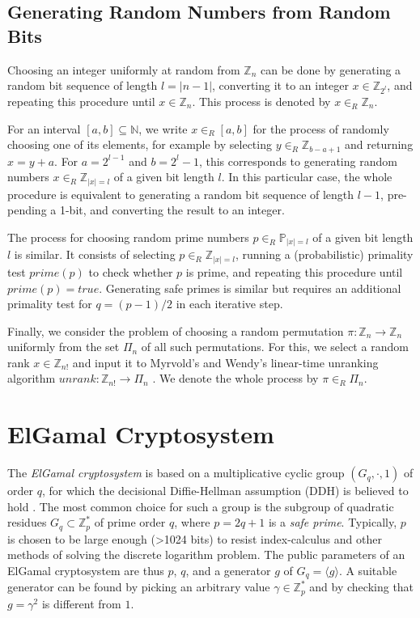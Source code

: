 \documentclass[bibtotoc,halfparskip,oneside]{scrreprt}
\begin{document}
	
	
	\subsection{Generating Random Numbers from Random Bits}
	Choosing an integer uniformly at random from $\mathbb{Z}_n$ can be done by generating a random bit sequence of length  $l=|n-1|$, converting it to an integer $x\in\mathbb{Z}_{2^l}$, and repeating this procedure until $x\in\mathbb{Z}_n$. This process is denoted by $x\in_R\mathbb{Z}_n$. 
	
	For an interval $[a,b]\subseteq \mathbb{N}$, we write $x\in_R[a,b]$ for the process of randomly choosing one of its elements, for example by selecting $y\in_R\mathbb{Z}_{b-a+1}$ and returning $x=y+a$. For $a=2^{l-1}$ and $b=2^l-1$, this corresponds to generating random numbers $x\in_R\mathbb{Z}_{|x|=l}$ of a given bit length $l$. In this particular case, the whole procedure is equivalent to generating a random bit sequence of length $l-1$, pre-pending a 1-bit, and converting the result to an integer.
	
	The process for choosing random prime numbers $p\in_R\mathbb{P}_{|x|=l}$ of a given bit length $l$ is similar. It consists of selecting $p\in_R\mathbb{Z}_{|x|=l}$, running a (probabilistic) primality test $\mathit{prime}(p)$ to check whether $p$ is prime, and repeating this procedure until $\mathit{prime}(p)=\mathit{true}$. Generating safe primes is similar but requires an additional primality test for $q=(p-1)/2$ in each iterative step.
	
	Finally, we consider the problem of choosing a random permutation $\pi:\mathbb{Z}_n\rightarrow\mathbb{Z}_n$ uniformly from the set $\Pi_n$ of all such permutations. For this, we select a random rank $x\in \mathbb{Z}_{n!}$ and input it to Myrvold's and Wendy's linear-time unranking algorithm $\mathit{unrank}:\mathbb{Z}_{n!}\rightarrow\Pi_n$ \cite{MR01}. We denote the whole process by $\pi\in_R\Pi_n$.
	
	\section{ElGamal Cryptosystem} 
	
	The \emph{ElGamal cryptosystem} is based on a multiplicative cyclic group $(G_q,\cdot,1)$ of order $q$, for which the decisional Diffie-Hellman assumption (DDH) is believed to hold \cite{gamal84}. The most common choice for such a group is the subgroup of quadratic residues $G_q\subset\mathbb{Z}_p^*$ of prime order $q$, where $p=2q+1$ is a \emph{safe prime}. Typically, $p$ is chosen to be large enough (>1024 bits) to resist index-calculus and other methods of solving the discrete logarithm problem. The public parameters of an ElGamal cryptosystem are thus $p$, $q$, and a generator $g$ of $G_q=\langle g\rangle$. A suitable generator can be found by picking an arbitrary value $\gamma\in\mathbb{Z}_p^*$ and by checking that $g=\gamma^2$ is different from $1$.
	
\end{document}
